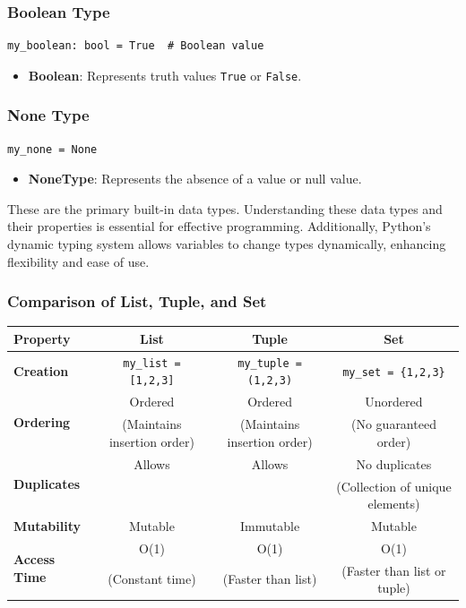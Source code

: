 \subsubsection{Boolean Type}
\begin{codebox}
\begin{verbatim}
my_boolean: bool = True  # Boolean value
\end{verbatim}
\end{codebox}
\begin{itemize}
\item \textbf{Boolean}: Represents truth values \texttt{True} or \texttt{False}.
\end{itemize}

\subsubsection{None Type}
\begin{codebox}
\begin{verbatim}
my_none = None
\end{verbatim}
\end{codebox}
\begin{itemize}
\item \textbf{NoneType}: Represents the absence of a value or null value.
\end{itemize}

These are the primary built-in data types. Understanding these data types and their properties is essential for effective programming. Additionally, Python's dynamic typing system allows variables to change types dynamically, enhancing flexibility and ease of use.

\subsubsection{Comparison of List, Tuple, and Set}

\begin{table}[htbp]
\centering
\label{tab:comparison}
\begin{tabular}{|l|c|c|c|}
\hline
\textbf{Property} & \textbf{List} & \textbf{Tuple} & \textbf{Set} \\
\hline
\textbf{Creation} & \texttt{my\_list = [1,2,3]} & \texttt{my\_tuple = (1,2,3)} & \texttt{my\_set = \{1,2,3\}} \\
\hline
\multirow{2}{*}{\textbf{Ordering}} & Ordered & Ordered & Unordered \\
 & (Maintains insertion order) & (Maintains insertion order) & (No guaranteed order) \\
\hline
\multirow{2}{*}{\textbf{Duplicates}} & Allows & Allows & No duplicates \\
 &  &  & (Collection of unique elements) \\
\hline
\textbf{Mutability} & Mutable & Immutable & Mutable \\
\hline
\multirow{2}{*}{\textbf{Access Time}} & O(1) & O(1) & O(1) \\
 & (Constant time) & (Faster than list) & (Faster than list or tuple) \\
\hline
\end{tabular}
\end{table} 

